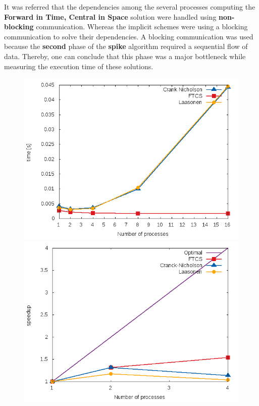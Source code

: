 \documentclass[12pt]{article}
\begin{document}
\par It was referred that the dependencies among the several processes computing the \textbf{Forward in Time, Central in Space} solution were handled using \textbf{non-blocking} communication. Whereas the implicit schemes were using a blocking communication to solve their dependencies. A blocking communication was used because the \textbf{second} phase of the \textbf{spike} algorithm required a sequential flow of data. Thereby, one can conclude that this phase was a major bottleneck while measuring the execution time of these solutions. 

\begin{figure}[!htb]
\centering
\begin{minipage}{.5\textwidth}
  \centering
  \includegraphics[width=0.8\linewidth]{times.png}
\end{minipage}%
\begin{minipage}{.5\textwidth}
  \centering
  \includegraphics[width=.8\linewidth]{speedup.png}
\end{minipage}
\end{figure}
\end{document}
